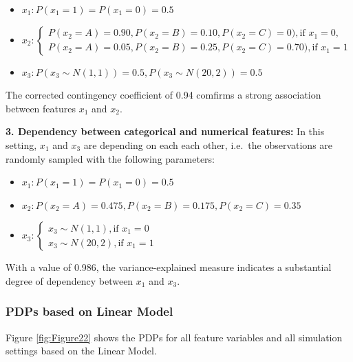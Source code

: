 \documentclass[
]{krantz}
\providecommand{\tightlist}{%
  \setlength{\itemsep}{0pt}\setlength{\parskip}{0pt}}
\begin{document}
\begin{itemize}
\tightlist
\item
  \(x_1: P(x_1=1)=P(x_1=0)=0.5\)
\item
  \(x_2: \begin{cases} P(x_2=A)=0.90, P(x_2=B)=0.10, P(x_2=C)=0), \text{if } x_1=0, \\ P(x_2=A)=0.05, P(x_2=B)=0.25, P(x_2=C)=0.70), \text{if } x_1=1 \end{cases}\)
\item
  \(x_3: P(x_3 \sim N(1,1))=0.5, P(x_3 \sim N(20,2))=0.5\)
\end{itemize}

The corrected contingency coefficient of 0.94 comfirms a strong association between features \(x_1\) and \(x_2\).

\textbf{3. Dependency between categorical and numerical features:} In this setting, \(x_1\) and \(x_3\) are depending on each each other, i.e.~the observations are randomly sampled with the following parameters:

\begin{itemize}
\tightlist
\item
  \(x_1: P(x_1=1)=P(x_1=0)=0.5\)
\item
  \(x_2: P(x_2=A)=0.475, P(x_2=B)=0.175, P(x_2=C)=0.35\)
\item
  \(x_3: \begin{cases} x_3 \sim N(1,1), \text{if } x_1=0 \\ x_3 \sim N(20,2), \text{if } x_1=1 \end{cases}\)
\end{itemize}

With a value of 0.986, the variance-explained measure indicates a substantial degree of dependency between \(x_1\) and \(x_3\).

\hypertarget{pdps-based-on-linear-model-2}{%
\subsubsection{PDPs based on Linear Model}\label{pdps-based-on-linear-model-2}}

Figure \ref{fig:Figure22} shows the PDPs for all feature variables and all simulation settings based on the Linear Model.
\end{document}
